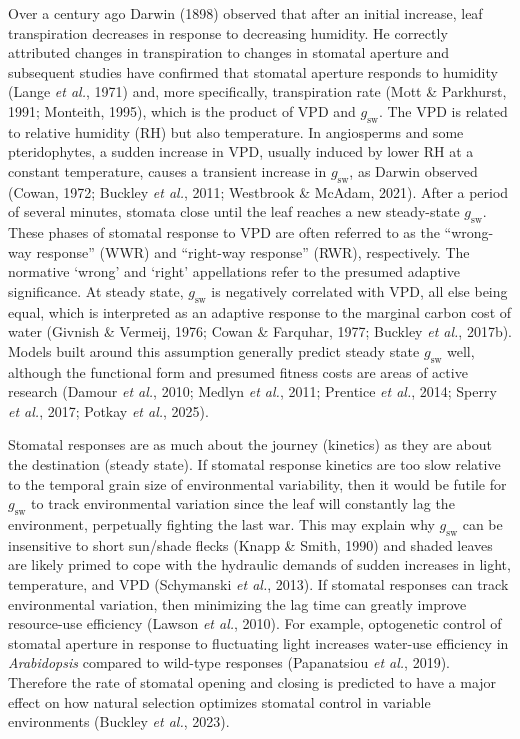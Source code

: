 \documentclass[
  letterpaper,
  DIV=11,
  numbers=noendperiod]{scrartcl}
\newcommand{\gsw}{$g_\mathrm{sw}$}
\begin{document}
Over a century ago Darwin (1898) observed that after an initial
increase, leaf transpiration decreases in response to decreasing
humidity. He correctly attributed changes in transpiration to changes in
stomatal aperture and subsequent studies have confirmed that stomatal
aperture responds to humidity (Lange \emph{et al.}, 1971) and, more
specifically, transpiration rate (Mott \& Parkhurst, 1991; Monteith,
1995), which is the product of VPD and \gsw. The VPD is related to
relative humidity (RH) but also temperature. In angiosperms and some
pteridophytes, a sudden increase in VPD, usually induced by lower RH at
a constant temperature, causes a transient increase in \gsw, as Darwin
observed (Cowan, 1972; Buckley \emph{et al.}, 2011; Westbrook \& McAdam,
2021). After a period of several minutes, stomata close until the leaf
reaches a new steady-state \gsw. These phases of stomatal response to
VPD are often referred to as the ``wrong-way response'' (WWR) and
``right-way response'' (RWR), respectively. The normative `wrong' and
`right' appellations refer to the presumed adaptive significance. At
steady state, \gsw{} is negatively correlated with VPD, all else being
equal, which is interpreted as an adaptive response to the marginal
carbon cost of water (Givnish \& Vermeij, 1976; Cowan \& Farquhar, 1977;
Buckley \emph{et al.}, 2017b). Models built around this assumption
generally predict steady state \gsw{} well, although the functional form
and presumed fitness costs are areas of active research (Damour \emph{et
al.}, 2010; Medlyn \emph{et al.}, 2011; Prentice \emph{et al.}, 2014;
Sperry \emph{et al.}, 2017; Potkay \emph{et al.}, 2025).

Stomatal responses are as much about the journey (kinetics) as they are
about the destination (steady state). If stomatal response kinetics are
too slow relative to the temporal grain size of environmental
variability, then it would be futile for \gsw{} to track environmental
variation since the leaf will constantly lag the environment,
perpetually fighting the last war. This may explain why \gsw{} can be
insensitive to short sun/shade flecks (Knapp \& Smith, 1990) and shaded
leaves are likely primed to cope with the hydraulic demands of sudden
increases in light, temperature, and VPD (Schymanski \emph{et al.},
2013). If stomatal responses can track environmental variation, then
minimizing the lag time can greatly improve resource-use efficiency
(Lawson \emph{et al.}, 2010). For example, optogenetic control of
stomatal aperture in response to fluctuating light increases water-use
efficiency in \emph{Arabidopsis} compared to wild-type responses
(Papanatsiou \emph{et al.}, 2019). Therefore the rate of stomatal
opening and closing is predicted to have a major effect on how natural
selection optimizes stomatal control in variable environments (Buckley
\emph{et al.}, 2023).
\end{document}
